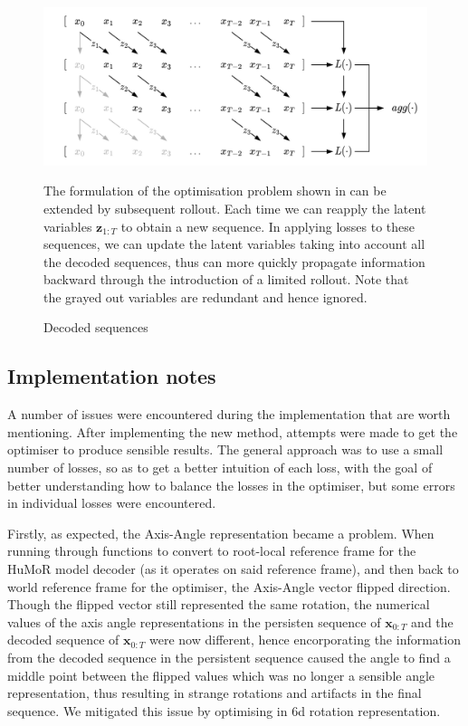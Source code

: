 \begin{figure}
    \label{fig:dimm_decoded_sequences}
    \centering
    \includegraphics[width=1\textwidth]{Figures/humor/improvement/Rollout_overlap.png}
    \caption{Decoded sequences}
    \medskip
    \small
    The formulation of the optimisation problem shown in  can be extended by subsequent rollout. Each time we can reapply the latent variables $\mathbf{z}_{1:T}$ to obtain a new sequence. In applying losses to these sequences, we can update the latent variables taking into account all the decoded sequences, thus can more quickly propagate information backward through the introduction of a limited rollout. Note that the grayed out variables are redundant and hence ignored.
\end{figure}





\subsection{Implementation notes}

A number of issues were encountered during the implementation that are worth mentioning. After implementing the new method, attempts were made to get the optimiser to produce sensible results. The general approach was to use a small number of losses, so as to get a better intuition of each loss, with the goal of better understanding how to balance the losses in the optimiser, but some errors in individual losses were encountered.

Firstly, as expected, the Axis-Angle representation became a problem. When running through functions to convert to root-local reference frame for the HuMoR model decoder (as it operates on said reference frame), and then back to world reference frame for the optimiser, the Axis-Angle vector flipped direction. Though the flipped vector still represented the same rotation, the numerical values of the axis angle representations in the persisten sequence of $\mathbf{x}_{0:T}$ and the decoded sequence of $\mathbf{x}_{0:T}$ were now different, hence encorporating the information from the decoded sequence in the persistent sequence caused the angle to find a middle point between the flipped values which was no longer a sensible angle representation, thus resulting in strange rotations and artifacts in the final sequence. We mitigated this issue by optimising in 6d rotation representation.

